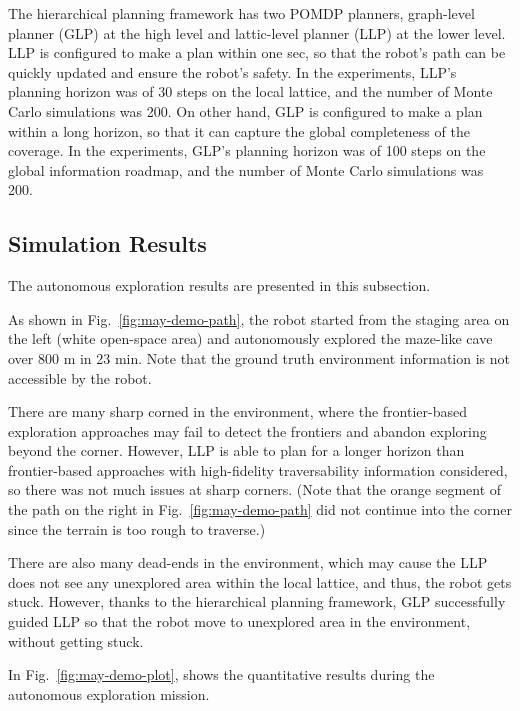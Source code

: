 \documentclass{article}
\begin{document}
The hierarchical planning framework has two POMDP planners, graph-level planner (GLP) at the high level and lattic-level planner (LLP) at the lower level.
LLP is configured to make a plan within one sec, so that the robot's path can be quickly updated and ensure the robot's safety.
In the experiments, LLP's planning horizon was of 30 steps on the local lattice, and the number of Monte Carlo simulations was 200.
On other hand, GLP is configured to make a plan within a long horizon, so that it can capture the global completeness of the coverage.
In the experiments, GLP's planning horizon was of 100 steps on the global information roadmap, and the number of Monte Carlo simulations was 200.


\subsection{Simulation Results}

The autonomous exploration results are presented in this subsection. %

As shown in Fig.~\ref{fig:may-demo-path}, the robot started from the staging area on the left (white open-space area) and autonomously explored the maze-like cave over 800 m in 23 min.
Note that the ground truth environment information is not accessible by the robot.

There are many sharp corned in the environment, where the frontier-based exploration approaches may fail to detect the frontiers and abandon exploring beyond the corner.
However, LLP is able to plan for a longer horizon than frontier-based approaches with high-fidelity traversability information considered, so there was not much issues at sharp corners.
(Note that the orange segment of the path on the right in Fig.~\ref{fig:may-demo-path} did not continue into the corner since the terrain is too rough to traverse.)

There are also many dead-ends in the environment, which may cause the LLP does not see any unexplored area within the local lattice, and thus, the robot gets stuck.
However, thanks to the hierarchical planning framework, GLP successfully guided LLP so that the robot move to unexplored area in the environment, without getting stuck.

In Fig.~\ref{fig:may-demo-plot}, shows the quantitative results during the autonomous exploration mission.
\end{document}
